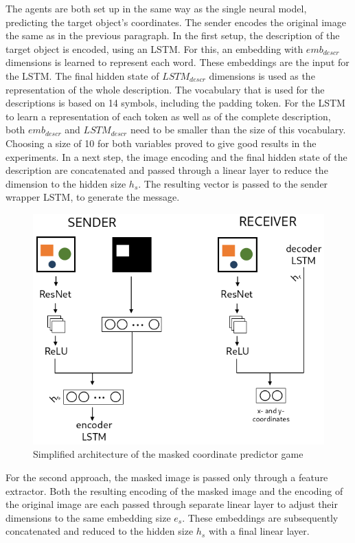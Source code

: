 The agents are both set up in the same way as the single neural model, predicting the target object's coordinates.
The sender encodes the original image the same as in the previous paragraph.
In the first setup, the description of the target object is encoded, using an LSTM.
For this, an embedding with $emb_{descr}$ dimensions is learned to represent each word.
These embeddings are the input for the LSTM.
The final hidden state of $LSTM_{descr}$ dimensions is used as the representation of the whole description.
The vocabulary that is used for the descriptions is based on 14 symbols, including the padding token.
For the LSTM to learn a representation of each token as well as of the complete description, both $emb_{descr}$ and $LSTM_{descr}$ need to be smaller than the size of this vocabulary.
Choosing a size of 10 for both variables proved to give good results in the experiments.
In a next step, the image encoding and the final hidden state of the description are concatenated and passed through a linear layer to reduce the dimension to the hidden size $h_s$.
The resulting vector is passed to the sender wrapper LSTM, to generate the message.

\begin{figure}[h]
    \centering
    \includegraphics[width=.7\linewidth]{figures/arch_coordinate_predictor_game.png}
    \caption{Simplified architecture of the masked coordinate predictor game}
    \label{fig:coordinate_predictor_game_architecture}
\end{figure}

For the second approach, the masked image is passed only through a feature extractor.
Both the resulting encoding of the masked image and the encoding of the original image are each passed through separate linear layer to adjust their dimensions to the same embedding size $e_s$.
These embeddings are subsequently concatenated and reduced to the hidden size $h_s$ with a final linear layer.

